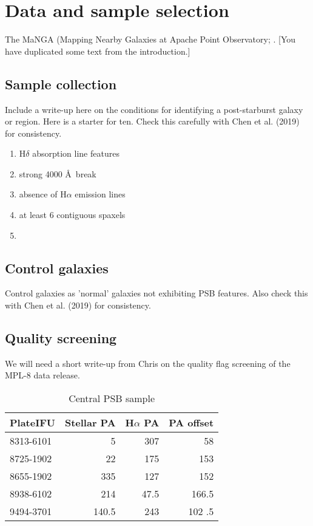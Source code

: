 \section{Data and sample selection}
\label{sec:sample}
The MaNGA (Mapping Nearby Galaxies at Apache Point Observatory; \citet{2015ApJ...798....7B}. [You have duplicated some text from the introduction.]
\subsection{Sample collection}
Include a write-up here on the conditions for identifying a post-starburst galaxy or region. Here is a starter for ten. Check this carefully with Chen et al. (2019) for consistency.
\begin{enumerate}
    \item H$\delta$ absorption line features
    \item strong 4000 \AA\ break 
    \item absence of H$\alpha$ emission lines
    \item at least 6 contiguous spaxels
    \item 
\end{enumerate}

\subsection{Control galaxies}
Control galaxies as 'normal' galaxies not exhibiting PSB features. Also check this with Chen et al. (2019) for consistency.

\subsection{Quality screening}
We will need a short write-up from Chris on the quality flag screening of the MPL-8 data release.

\begin{table}[H]
\caption{Central PSB sample}
\begin{tabular}{lrrr}
PlateIFU  & Stellar PA & H$\alpha$ PA & PA offset \\
\hline
\hline
8313-6101 & 5           & 307        & 58         \\
8725-1902 & 22          & 175        & 153        \\
8655-1902 & 335         & 127        & 152        \\
8938-6102 & 214         & 47.5       & 166.5      \\
9494-3701 & 140.5       & 243        & 102 .5            
\hline
\end{tabular}
\end{table}